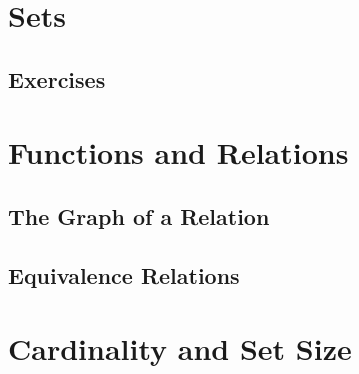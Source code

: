 

\section{Sets}


\subsection{Exercises}


\section{Functions and Relations}


\subsection{The Graph of a Relation}


\subsection{Equivalence Relations}


\section{Cardinality and Set Size}
